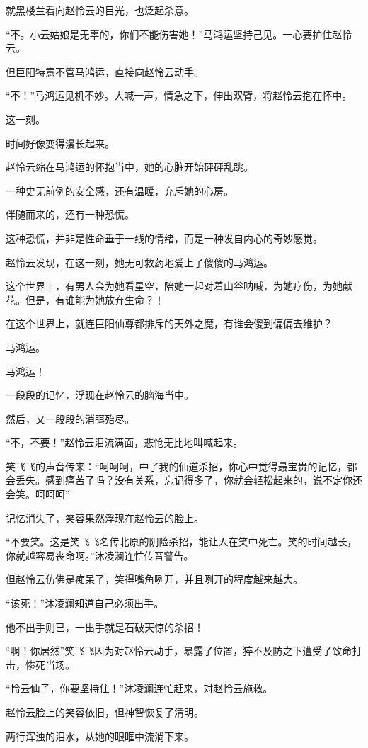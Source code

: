 \begin{this_body}
就黑楼兰看向赵怜云的目光，也泛起杀意。

“不。小云姑娘是无辜的，你们不能伤害她！”马鸿运坚持己见。一心要护住赵怜云。

但巨阳特意不管马鸿运，直接向赵怜云动手。

“不！”马鸿运见机不妙。大喊一声，情急之下，伸出双臂，将赵怜云抱在怀中。

这一刻。

时间好像变得漫长起来。

赵怜云缩在马鸿运的怀抱当中，她的心脏开始砰砰乱跳。

一种史无前例的安全感，还有温暖，充斥她的心房。

伴随而来的，还有一种恐慌。

这种恐慌，并非是性命垂于一线的情绪，而是一种发自内心的奇妙感觉。

赵怜云发现，在这一刻，她无可救药地爱上了傻傻的马鸿运。

这个世界上，有男人会为她看星空，陪她一起对着山谷呐喊，为她疗伤，为她献花。但是，有谁能为她放弃生命？！

在这个世界上，就连巨阳仙尊都排斥的天外之魔，有谁会傻到偏偏去维护？

马鸿运。

马鸿运！

一段段的记忆，浮现在赵怜云的脑海当中。

然后，又一段段的消弭殆尽。

“不，不要！”赵怜云泪流满面，悲怆无比地叫喊起来。

笑飞飞的声音传来：“呵呵呵，中了我的仙道杀招，你心中觉得最宝贵的记忆，都会丢失。感到痛苦了吗？没有关系，忘记得多了，你就会轻松起来的，说不定你还会笑。呵呵呵”

记忆消失了，笑容果然浮现在赵怜云的脸上。

“不要笑。这是笑飞飞名传北原的阴险杀招，能让人在笑中死亡。笑的时间越长，你就越容易丧命啊。”沐凌澜连忙传音警告。

但赵怜云仿佛是痴呆了，笑得嘴角咧开，并且咧开的程度越来越大。

“该死！”沐凌澜知道自己必须出手。

他不出手则已，一出手就是石破天惊的杀招！

“啊！你居然”笑飞飞因为对赵怜云动手，暴露了位置，猝不及防之下遭受了致命打击，惨死当场。

“怜云仙子，你要坚持住！”沐凌澜连忙赶来，对赵怜云施救。

赵怜云脸上的笑容依旧，但神智恢复了清明。

两行浑浊的泪水，从她的眼眶中流淌下来。


\end{this_body}

